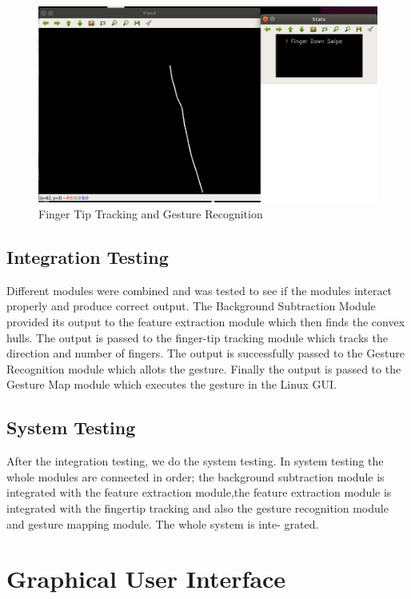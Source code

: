 \documentclass[11pt]{report}
\begin{document}
\begin{figure}[H]
    \includegraphics[width=15cm]{gesture.png}
    
    \caption{Finger Tip Tracking and Gesture Recognition}
\end{figure}



\section{Integration Testing}

Different modules were combined and was tested to see if the modules interact properly and produce
correct output. The Background Subtraction Module provided its output to the feature extraction module
which then finds the convex hulls. The output is passed to the finger-tip tracking module which tracks the 
direction and number of fingers. The output is successfully passed to the Gesture Recognition module which allots the gesture.
Finally the output is passed to the Gesture Map module which executes the gesture in the Linux GUI.

\section{System Testing}

After the integration testing, we do the system testing. In system testing the whole modules are
connected in order; the background subtraction module is integrated with the feature extraction module,the
feature extraction module is integrated with the fingertip tracking and also the gesture recognition
module and gesture mapping module. The whole system is inte-
grated.



\chapter{Graphical User Interface}
\end{document}
